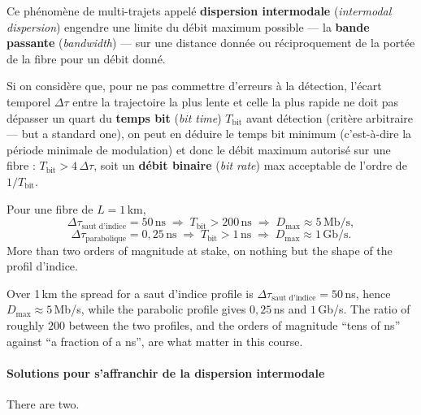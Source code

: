 \begin{definition}
  Ce phénomène de multi-trajets appelé \textbf{dispersion intermodale}
  (\textit{intermodal dispersion}) engendre une limite du débit maximum
  possible --- la \textbf{bande passante} (\textit{bandwidth}) --- sur une
  distance donnée ou réciproquement de la portée de la fibre pour un débit
  donné.
\end{definition}

Si on considère que, pour ne pas commettre d'erreurs à la détection, l'écart
temporel $\Delta\tau$ entre la trajectoire la plus lente et celle la plus rapide
ne doit pas dépasser un quart du \textbf{temps bit} (\textit{bit time})
$T_{\text{bit}}$ avant détection (critère arbitraire --- but a standard one), on
peut en déduire le temps bit minimum (c'est-à-dire la période minimale de
modulation) et donc le débit maximum autorisé sur une fibre :
$T_{\text{bit}} > 4\,\Delta\tau$, soit un \textbf{débit binaire}
(\textit{bit rate}) max acceptable de l'ordre de $1/T_{\text{bit}}$.

\begin{example}
  Pour une fibre de $L = 1$\,km,
  \[
    \Delta\tau_{\text{saut d'indice}} = 50\,\mathrm{ns}
    \;\Rightarrow\; T_{\text{bit}} > 200\,\mathrm{ns}
    \;\Rightarrow\; D_{\max} \approx 5\,\mathrm{Mb/s},
  \]
  \[
    \Delta\tau_{\text{parabolique}} = 0{,}25\,\mathrm{ns}
    \;\Rightarrow\; T_{\text{bit}} > 1\,\mathrm{ns}
    \;\Rightarrow\; D_{\max} \approx 1\,\mathrm{Gb/s}.
  \]
  More than two orders of magnitude at stake, on nothing but the shape of the
  profil d'indice.
\end{example}

\begin{remark}
  Over 1\,km the spread for a saut d'indice profile is
  $\Delta\tau_{\text{saut d'indice}} = 50$\,ns,
  hence $D_{\max} \approx 5$\,Mb/s, while the parabolic profile gives
  $0{,}25$\,ns and $1$\,Gb/s. The ratio of roughly $200$ between the two
  profiles, and the orders of magnitude ``tens of ns'' against ``a fraction of
  a ns'', are what matter in this course.
\end{remark}

\paragraph{Solutions pour s'affranchir de la dispersion intermodale} There are
two.

